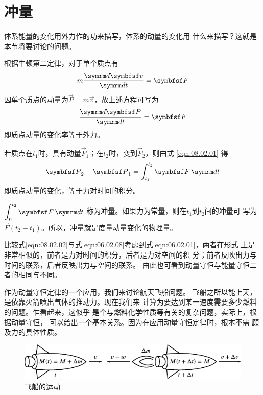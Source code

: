 \section[冲量]{冲\qquad 量}\label{sec:08.02}

体系能量的变化用外力作的功来描写，体系的动量的变化用
什么来描写？这就是本节将要讨论的问题。

根据牛顿第二定律，对于单个质点有
\begin{equation*}
  m \frac { \dif \vec{v} } { \dif t } = \vec{F}
\end{equation*}
因单个质点的动量为$  \vec{P} = m \vec{v}   $，故上述方程可写为
\begin{equation}\label{eqn:08.02.01}
  \frac { \dif \vec{P} } { \dif t } = \vec{F}
\end{equation}
即质点动量的变化率等于外力。

若质点在$  t _ { 1 }   $时，具有动量$\vec{P} _ 1$；在$ t _ { 2 } $时，变到$\vec{P} _ 2$，则由式 \eqref{eqn:08.02.01}
得
\begin{equation}\label{eqn:08.02.02}
  \vec{P} _ { 2 } - \vec{P} _ { 1 } = \int _ { t _ { 1 } } ^ { t _ { 2 } } \vec{F} \dif t
\end{equation}
即质点动量的变化，等于力对时间的积分。

$ \displaystyle \int _ { t _ { 1 } } ^ { t _ { 2 } } \vec{F} \dif t $
称为冲量。如果力为常量，则在$ t_1 $到$ t_2 $间的冲量可
写为$  \vec{F} \left( t _ { 2 } - t _ { 1 } \right) $。所以，冲量就是度量动量变化的物理量。

\clearpage
比较式\eqref{eqn:08.02.02}与式\eqref{eqn:06.02.08}\lhbrak 考虑到式\eqref{eqn:06.02.01}\rhbrak ，两者在形式
上是非常相似的，前者是力对时间的积分，后者是力对空间的积
分；前者反映出力与时间的联系，后者反映出力与空间的联系。
由此也可看到动量守恒与能量守恒二者的相同与不同。

作为动量守恒定律的一个应用，我们来讨论航天飞船问题。
飞船之所以能上天，是依靠火箭喷出气体的推动力。现在我们来
计算为要达到某一速度需要多少燃料的问题。乍看起来，这似乎
是个与燃料化学性质等有关的复杂问题，实际上，根据动量守恒，
可以给出一个基本关系。因为在应用动量守恒定律时，根本不需
顾及力的具体性质。

\begin{figure}[h]
  \centering
  \includegraphics{figure/fig08.04}
  \caption{飞船的运动}
  \label{fig:08.04}
\end{figure}

